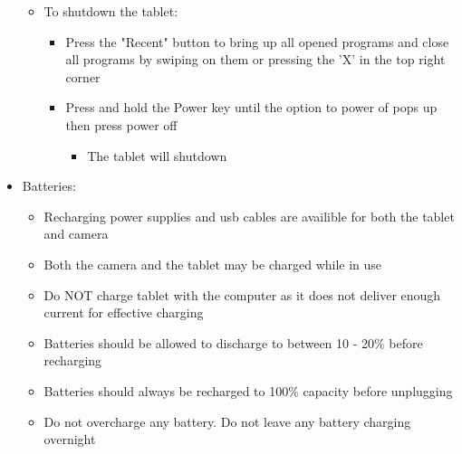 \documentclass[letterpaper,11pt]{article}
\begin{document}
\begin{itemize}
\begin{itemize}
\begin{itemize}
            \end{itemize}
        
        \item To shutdown the tablet:
            \begin{itemize}
            \item Press the "Recent" button to bring up all opened programs and 
                close all programs by swiping on them or pressing the 'X' in the
                top right corner
            \item Press and hold the Power key until the option to power of 
                pops up then press power off
                \begin{itemize}
                \item The tablet will shutdown
                \end{itemize}
           
            \end{itemize}
        
        \end{itemize}
    
    \item Batteries:
        \begin{itemize}
        \item Recharging power supplies and usb cables are availible for both
            the tablet and camera
        \item Both the camera and the tablet may be charged while in use
        \item Do NOT charge tablet with the computer as it does not deliver 
            enough current for effective charging
        \item Batteries should be allowed to discharge to between 10 - 20\%
            before recharging
        \item Batteries should always be recharged to 100\% capacity before 
            unplugging
        \item Do not overcharge any battery. Do not leave any battery 
            charging overnight
        \end{itemize}
        
    \end{itemize}
    
    
\newpage %
\end{document}
